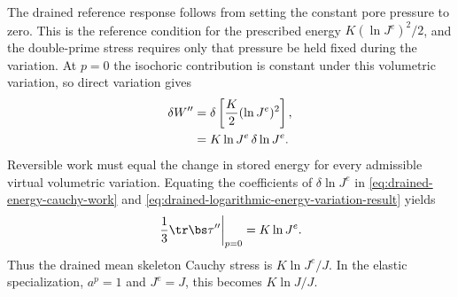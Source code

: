 The drained reference response follows from setting the constant pore
pressure to zero.  This is the reference condition for the prescribed energy
\(K(\ln J^e)^2/2\), and the double-prime stress requires only that pressure
be held fixed during the variation.  At \(p=0\) the isochoric contribution is
constant under this volumetric variation, so direct variation gives
\begin{align}
 \delta W^{\prime\prime}
 &=\delta\left[\frac K2(\ln J^e)^2\right],
 \notag
\\
 &=K\ln J^e\,\delta\ln J^e.
 \label{eq:drained-logarithmic-energy-variation-result}
\end{align}
Reversible work must equal the change in stored energy for every admissible
virtual volumetric variation.  Equating the coefficients of \(\delta\ln J^e\)
in \eqref{eq:drained-energy-cauchy-work} and
\eqref{eq:drained-logarithmic-energy-variation-result} yields
\begin{equation}
 \left.\frac13\tr\bs\tau^{\prime\prime}\right|_{p=0}
 =K\ln J^e.
 \label{eq:drained-volumetric-energy-derivative}
\end{equation}
Thus the drained mean skeleton Cauchy stress is \(K\ln J^e/J\).
In the elastic specialization, \(a^p=1\) and \(J^e=J\), this becomes
\(K\ln J/J\).

